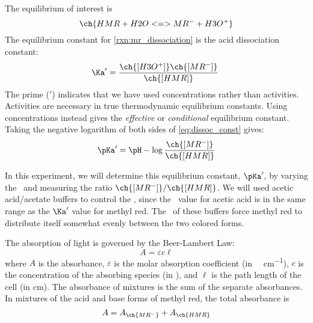 The equilibrium of interest is 
\begin{equation}
	\ch{HMR + H2O <=> MR^- + H3O^+}
	\label{rxn:mr_dissociation}
\end{equation}
The equilibrium constant for \cref{rxn:mr_dissociation} is the acid dissociation constant:
\begin{equation}
	\Ka' = \frac{\ch{[H3O^+]}\ch{[MR^-]}}{\ch{[HMR]}}\
	\label{eq:dissoc_const}
\end{equation}
The prime (\('\)) indicates that we have used concentrations rather than activities.
Activities are necessary in true thermodynamic equilibrium constants. 
Using concentrations instead gives the \emph{effective} or \emph{conditional} equilibrium constant.
Taking the negative logarithm  of both sides of \cref{eq:dissoc_const} gives:
\begin{equation}
	\pKa' = \pH - \log{\frac{\ch{[MR^-]}}{\ch{[HMR]}}}
	\label{eq:p_dissoc_const}
\end{equation}

In this experiment, we will determine this equilibrium constant, \(\pKa'\), by varying the \pH\ and measuring the ratio \(\ch{[MR^-]}/\ch{[HMR]}\). 
We will used acetic acid/acetate buffers to control the \pH, since the \Ka\ value for acetic acid is in the same range as the \(\Ka'\) value for methyl red. 
The \pH\ of these buffers force methyl red to distribute itself somewhat evenly between the two colored forms. 

The absorption of light is governed by the Beer-Lambert Law:
\begin{equation}
	A = \varepsilon c \ell
	\label{eq:beer-lambert_law}
\end{equation}
where \(A\) is the absorbance, \(\varepsilon\) is the molar absorption coefficient (in \unit{\per\Molar\per\cm}), \(c\) is the concentration of the absorbing species (in \unit{\Molar}), and \(\ell\) is the path length of the cell (in \unit{\cm}). 
The absorbance of mixtures is the sum of the separate absorbances. 
In mixtures of the acid and base forms of methyl red, the total absorbance is 
\begin{equation}
	A = A_{\ch{MR^-}} + A_{\ch{HMR}}
	\label{eq:summed_absorbances}
\end{equation}

